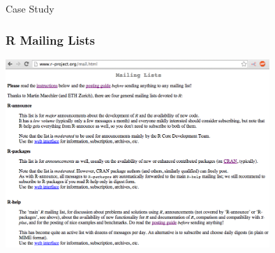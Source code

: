\documentclass{beamer}\usepackage[]{graphicx}\usepackage[]{color}
\begin{document}

\begin{frame}
 \begin{center}
  {\Huge \textcolor{mandarina}{Case Study}}
 \end{center}
\end{frame}


\begin{frame}
\frametitle{R Mailing Lists}

\begin{center}
\includegraphics[width=10cm]{images/mailing_lists.png}
\end{center}

\end{frame}

\end{document}
